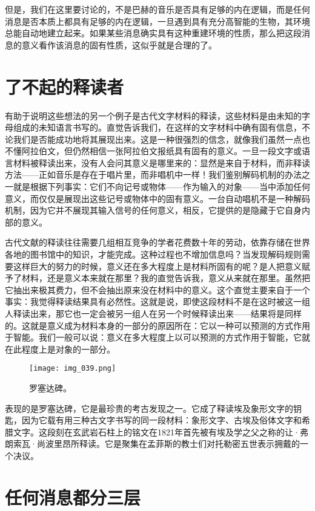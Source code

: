 但是，我们在这里要讨论的，不是巴赫的音乐是否具有足够的内在逻辑，而是任何消息是否本质上都具有足够的内在逻辑，一旦遇到具有充分高智能的生物，其环境总能自动地建立起来。如果某些消息确实具有这种重建环境的性质，那么把这段消息的意义看作该消息的固有性质，这似乎就是合理的了。

\section{了不起的释读者}

有助于说明这些想法的另一个例子是古代文字材料的释读，这些材料是由未知的字母组成的未知语言书写的。直觉告诉我们，在这样的文字材料中确有固有信息，不论我们是否能成功地将其展现出来。这是一种很强烈的信念，就像我们虽然一点也不懂阿拉伯文，但仍然相信一张阿拉伯文报纸具有固有的意义。一旦一段文字或语言材料被释读出来，没有人会问其意义是哪里来的：显然是来自于材料，而非释读方法——正如音乐是存在于唱片里，而非唱机中一样！我们鉴别解码机制的办法之一就是根据下列事实：它们不向记号或物体——作为输入的对象——当中添加任何意义，而仅仅是展现出这些记号或物体中的固有意义。一台自动唱机不是一种解码机制，因为它并不展现其输入信号的任何意义，相反，它提供的是隐藏于它自身内部的意义。

古代文献的释读往往需要几组相互竞争的学者花费数十年的劳动，依靠存储在世界各地的图书馆中的知识，才能完成。这种过程也不增加信息吗？当发现解码规则需要这样巨大的努力的时候，意义还在多大程度上是材料所固有的呢？是人把意义赋予了材料，还是意义本来就在那里？我的直觉告诉我，意义从来就在那里。虽然把它抽出来极其费力，但不会抽出原来没在材料中的意义。这个直觉主要来自于一个事实：我觉得释读结果具有必然性。这就是说，即使这段材料不是在这时被这一组人释读出来，那它也一定会被另一组人在另一个时候释读出来——结果将是同样的。这就是意义成为材料本身的一部分的原因所在：它以一种可以预测的方式作用于智能。我们一般可以说：意义在多大程度上以可以预测的方式作用于智能，它就在此程度上是对象的一部分。

\begin{figure}
\texttt{[image: img\_039.png]}
\caption{罗塞达碑。}
\end{figure}

表现的是罗塞达碑，它是最珍贵的考古发现之一。它成了释读埃及象形文字的钥匙，因为它载有用三种古文字书写的同一段材料：象形文字、古埃及俗体文字和希腊文字。这段刻在玄武岩石柱上的铭文在1821年首先被有埃及学之父之称的让·弗朗索瓦·尚波里昂所释读。它是聚集在孟菲斯的教士们对托勒密五世表示拥戴的一个决议。

\section{任何消息都分三层}

